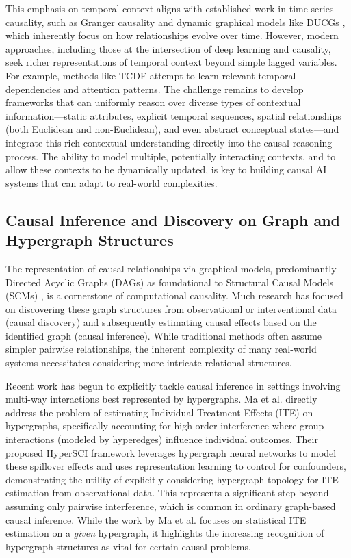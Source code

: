 This emphasis on temporal context aligns with established work in time series causality, such as Granger causality \cite{Granger1969Investigating} and dynamic graphical models like DUCGs \cite{Zhang2012Dynamic}, which inherently focus on how relationships evolve over time. However, modern approaches, including those at the intersection of deep learning and causality, seek richer representations of temporal context beyond simple lagged variables. For example, methods like TCDF \cite{Nauta2019Causal} attempt to learn relevant temporal dependencies and attention patterns. The challenge remains to develop frameworks that can uniformly reason over diverse types of contextual information---static attributes, explicit temporal sequences, spatial relationships (both Euclidean and non-Euclidean), and even abstract conceptual states---and integrate this rich contextual understanding directly into the causal reasoning process. The ability to model multiple, potentially interacting contexts, and to allow these contexts to be dynamically updated, is key to building causal AI systems that can adapt to real-world complexities.

\newpage

\subsection{Causal Inference and Discovery on Graph and Hypergraph Structures}
\label{subsec:causal_graphs_hypergraphs}

The representation of causal relationships via graphical models, predominantly Directed Acyclic Graphs (DAGs) as foundational to Structural Causal Models (SCMs) \cite{Pearl2009Causality}, is a cornerstone of computational causality. Much research has focused on discovering these graph structures from observational or interventional data (causal discovery) and subsequently estimating causal effects based on the identified graph (causal inference). While traditional methods often assume simpler pairwise relationships, the inherent complexity of many real-world systems necessitates considering more intricate relational structures.

Recent work has begun to explicitly tackle causal inference in settings involving multi-way interactions best represented by hypergraphs. Ma et al. \cite{ma2022learning} directly address the problem of estimating Individual Treatment Effects (ITE) on hypergraphs, specifically accounting for high-order interference where group interactions (modeled by hyperedges) influence individual outcomes. Their proposed HyperSCI framework leverages hypergraph neural networks to model these spillover effects and uses representation learning to control for confounders, demonstrating the utility of explicitly considering hypergraph topology for ITE estimation from observational data. This represents a significant step beyond assuming only pairwise interference, which is common in ordinary graph-based causal inference. While the work by Ma et al. focuses on statistical ITE estimation on a \textit{given} hypergraph, it highlights the increasing recognition of hypergraph structures as vital for certain causal problems.

